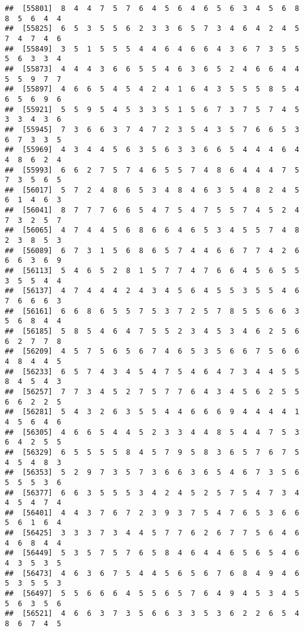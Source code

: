 \documentclass[
]{book}
\begin{document}
\begin{verbatim}
##  [55801]  8  4  4  7  5  7  6  4  5  6  4  6  5  6  3  4  5  6  8  8  5  6  4  4
##  [55825]  6  5  3  5  5  6  2  3  3  6  5  7  3  4  6  4  2  4  5  7  4  7  4  6
##  [55849]  3  5  1  5  5  5  4  4  6  4  6  6  4  3  6  7  3  5  5  5  6  3  3  4
##  [55873]  4  4  4  3  6  6  5  5  4  6  3  6  5  2  4  6  6  4  4  5  5  9  7  7
##  [55897]  4  6  6  5  4  5  4  2  4  1  6  4  3  5  5  5  8  5  4  6  5  6  9  6
##  [55921]  5  5  9  5  4  5  3  3  5  1  5  6  7  3  7  5  7  4  5  3  3  4  3  6
##  [55945]  7  3  6  6  3  7  4  7  2  3  5  4  3  5  7  6  6  5  3  6  7  3  3  5
##  [55969]  4  3  4  4  5  6  3  5  6  3  3  6  6  5  4  4  4  6  4  4  8  6  2  4
##  [55993]  6  6  2  7  5  7  4  6  5  5  7  4  8  6  4  4  4  7  5  7  3  5  6  5
##  [56017]  5  7  2  4  8  6  5  3  4  8  4  6  3  5  4  8  2  4  5  6  1  4  6  3
##  [56041]  8  7  7  7  6  6  5  4  7  5  4  7  5  5  7  4  5  2  4  7  3  2  5  7
##  [56065]  4  7  4  4  5  6  8  6  6  4  6  5  3  4  5  5  7  4  8  2  3  8  5  3
##  [56089]  6  7  3  1  5  6  8  6  5  7  4  4  6  6  7  7  4  2  6  6  6  3  6  9
##  [56113]  5  4  6  5  2  8  1  5  7  7  4  7  6  6  4  5  6  5  5  3  5  5  4  4
##  [56137]  4  7  4  4  4  2  4  3  4  5  6  4  5  5  3  5  5  4  6  7  6  6  6  3
##  [56161]  6  6  8  6  5  5  7  5  3  7  2  5  7  8  5  5  6  6  3  5  6  8  4  4
##  [56185]  5  8  5  4  6  4  7  5  5  2  3  4  5  3  4  6  2  5  6  6  2  7  7  8
##  [56209]  4  5  7  5  6  5  6  7  4  6  5  3  5  6  6  7  5  6  6  4  8  4  4  5
##  [56233]  6  5  7  4  3  4  5  4  7  5  4  6  4  7  3  4  4  5  5  8  4  5  4  3
##  [56257]  7  7  3  4  5  2  7  5  7  7  6  4  3  4  5  6  2  5  5  6  6  2  2  5
##  [56281]  5  4  3  2  6  3  5  5  4  4  6  6  6  9  4  4  4  4  1  4  5  6  4  6
##  [56305]  4  6  6  5  4  4  5  2  3  3  4  4  8  5  4  4  7  5  3  6  4  2  5  5
##  [56329]  6  5  5  5  5  8  4  5  7  9  5  8  3  6  5  7  6  7  5  4  5  4  8  3
##  [56353]  5  2  9  7  3  5  7  3  6  6  3  6  5  4  6  7  3  5  6  5  5  5  3  6
##  [56377]  6  6  3  5  5  5  3  4  2  4  5  2  5  7  5  4  7  3  4  4  5  4  7  4
##  [56401]  4  4  3  7  6  7  2  3  9  3  7  5  4  7  6  5  3  6  6  5  6  1  6  4
##  [56425]  3  3  3  7  3  4  4  5  7  7  6  2  6  7  7  5  6  4  6  4  6  8  4  4
##  [56449]  5  3  5  7  5  7  6  5  8  4  6  4  4  6  5  6  5  4  6  4  3  5  3  5
##  [56473]  4  6  3  6  7  5  4  4  5  6  5  6  7  6  8  4  9  4  6  5  3  5  5  3
##  [56497]  5  5  6  6  6  4  5  5  6  5  7  6  4  9  4  5  3  4  5  5  6  3  5  6
##  [56521]  4  6  6  3  7  3  5  6  6  3  3  5  3  6  2  2  6  5  4  8  6  7  4  5

\end{verbatim}
\end{document}
